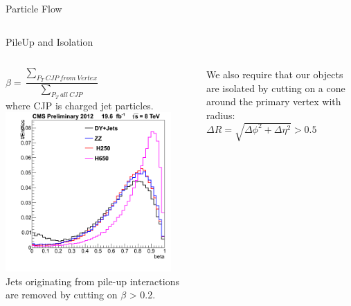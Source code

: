 \begin{frame}{Particle Flow}
\begin{columns}[T]
\begin{column}{0.40\textwidth}
  \end{column}
\end{columns}
\end{frame}















\begin{frame}{PileUp and Isolation}
\begin{columns}
\begin{column}{0.5\textwidth}
\begin{center}
$\beta = \dfrac{\sum_{P_T\ CJP\ from\ Vertex}}{\sum_{P_T\ all\ CJP}}$\\
\footnotesize
 where CJP is charged jet particles.
\includegraphics[width=0.89\textwidth]{images/beta.png}\\
Jets originating from pile-up interactions are removed by cutting on $\beta$ > 0.2.
\end{center}
\end{column}
\begin{column}{0.5\textwidth}
\begin{center}
{\footnotesize We also require that our objects are isolated by cutting on a cone around the primary vertex with radius:}\\
$\Delta R = \sqrt{\Delta \phi^2 + \Delta \eta^2} > 0.5$

\end{center}
\end{column}
\end{columns}
\end{frame}
